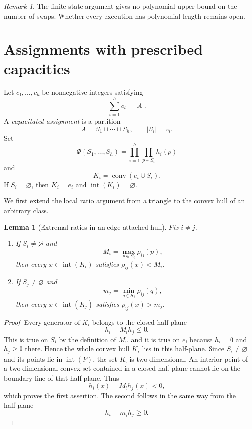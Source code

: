 \documentclass[final,5p,times,twocolumn]{elsarticle}
\newtheorem{lemma}[lemma]{Lemma}
\theoremstyle{definition}
\theoremstyle{remark}
\newtheorem{remark}[remark]{Remark}
\newcommand{\interior}[1]{\operatorname{int}(#1)}
\newcommand{\conv}{\operatorname{conv}}
\newcommand{\height}{h}
\newcommand{\ratio}{\rho}
\newcommand{\Potential}{\Phi}
\begin{document}
\begin{remark}
The finite-state argument gives no polynomial upper bound on the number of swaps. Whether every execution has polynomial length remains open.
\end{remark}

\section{Assignments with prescribed capacities}
\label{sec:capacitated}

Let $c_1,\ldots,c_h$ be nonnegative integers satisfying
\[
\sum_{i=1}^{h}c_i=|A|.
\]
A \emph{capacitated assignment} is a partition
\[
A=S_1\sqcup\cdots\sqcup S_h,
\qquad |S_i|=c_i.
\]
Set
\begin{equation}
\Potential(S_1,\ldots,S_h)
=
\prod_{i=1}^{h}\prod_{p\in S_i}\height_i(p)
\label{eq:cap-potential}
\end{equation}
and
\begin{equation}
K_i=\conv(e_i\cup S_i).
\label{eq:Ki}
\end{equation}
If $S_i=\varnothing$, then $K_i=e_i$ and $\interior{K_i}=\varnothing$.

We first extend the local ratio argument from a triangle to the convex hull of an arbitrary class.

\begin{lemma}[Extremal ratios in an edge-attached hull]
\label{lem:extremal-ratios}
Fix $i\neq j$.
\begin{enumerate}[label=\textup{(\roman*)}]
\item If $S_i\neq\varnothing$ and
\[
M_i=\max_{p\in S_i}\ratio_{ij}(p),
\]
then every $x\in\interior{K_i}$ satisfies $\ratio_{ij}(x)<M_i$.
\item If $S_j\neq\varnothing$ and
\[
m_j=\min_{q\in S_j}\ratio_{ij}(q),
\]
then every $x\in\interior{K_j}$ satisfies $\ratio_{ij}(x)>m_j$.
\end{enumerate}
\end{lemma}

\begin{proof}
Every generator of $K_i$ belongs to the closed half-plane
\[
\height_i-M_i\height_j\leq 0.
\]
This is true on $S_i$ by the definition of $M_i$, and it is true on $e_i$ because $\height_i=0$ and $\height_j\geq0$ there. Hence the whole convex hull $K_i$ lies in this half-plane. Since $S_i\neq\varnothing$ and its points lie in $\interior P$, the set $K_i$ is two-dimensional. An interior point of a two-dimensional convex set contained in a closed half-plane cannot lie on the boundary line of that half-plane. Thus
\[
\height_i(x)-M_i\height_j(x)<0,
\]
which proves the first assertion. The second follows in the same way from the half-plane
\[
\height_i-m_j\height_j\geq 0.
\]
\end{proof}
\end{document}
